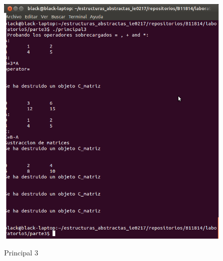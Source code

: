 \documentclass{article}
\begin{document}
\begin{figure}[hbtp]
\caption{Principal 3}
\includegraphics[scale=0.4]{./imagenes/principal3.png}
\label{fig:principal3}
\end{figure}
\end{document}
